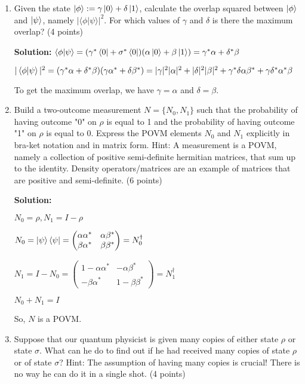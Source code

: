 \documentclass[12pt]{article}
\begin{document}
\begin{enumerate}[start=4]
    \item Given the state $\ket{\phi} := \gamma\ket{0}+\delta\ket{1}$, calculate the overlap squared between $\ket{\phi}$ and $\ket{\psi}$, namely $|\langle\phi|\psi\rangle|^2$. For which values of $\gamma$ and $\delta$ is there the maximum overlap? (4 points)

          \textbf{Solution:}
          $\braket{\phi|\psi} = (\gamma^*\bra{0}+\sigma^*\bra{0})(\alpha\ket{0}+\beta\ket{1}) = \gamma^*\alpha+\delta^*\beta$

          $|\braket{\phi|\psi}|^2 = (\gamma^*\alpha+\delta^*\beta)(\gamma\alpha^*+\delta\beta^*) = |\gamma|^2|\alpha|^2+|\delta|^2|\beta|^2+\gamma^*\delta\alpha\beta^*+\gamma\delta^*\alpha^*\beta$

          To get the maximum overlap, we have $\gamma=\alpha$ and $\delta=\beta$.
    \item Build a two-outcome measurement $N = \{N_0, N_1\}$ such that the probability of having outcome "0" on $\rho$ is equal to 1 and the probability of having outcome "1" on $\rho$ is equal to 0. Express the POVM elements $N_0$ and $N_1$ explicitly in bra-ket notation and in matrix form. Hint: A measurement is a POVM, namely a collection of positive semi-definite hermitian matrices, that sum up to the identity. Density operators/matrices are an example of matrices that are positive and semi-definite. (6 points)

          \textbf{Solution:}

          $N_0 = \rho, N_1 = I - \rho$

          $N_0 = \ket{\psi}\bra{\psi} =  \begin{pmatrix}
                  \alpha\alpha^* & \alpha\beta^* \\
                  \beta\alpha^*  & \beta\beta^*
              \end{pmatrix} = N_0^{\dagger}$

          $N_1 = I - N_0 = \begin{pmatrix}
                  1-\alpha\alpha^* & -\alpha\beta^* \\
                  -\beta\alpha^*   & 1-\beta\beta^*
              \end{pmatrix}=N_1^{\dagger}$


          $N_0+N_1 = I$

          So, $N$ is a POVM.



    \item Suppose that our quantum physicist is given many copies of either state $\rho$ or state $\sigma$. What can he do to find out if he had received many copies of state $\rho$ or of state $\sigma$? Hint: The assumption of having many copies is crucial! There is no way he can do it in a single shot. (4 points)


\end{enumerate}
\end{document}
